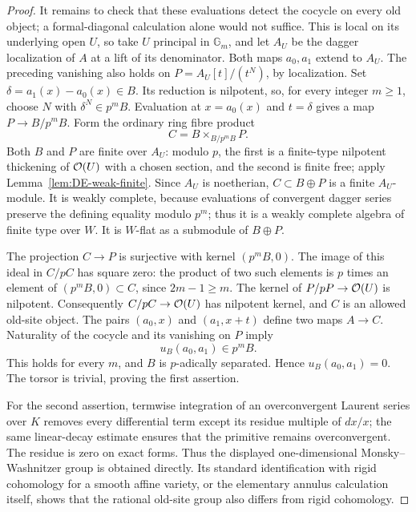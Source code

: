 \begin{proof}
It remains to check that these evaluations detect the cocycle on every old object; a formal-diagonal calculation alone would not suffice.  This is local on its underlying open $U$, so take $U$ principal in $\mathbb G_m$, and let $A_U$ be the dagger localization of $A$ at a lift of its denominator.  Both maps $a_0,a_1$ extend to $A_U$.  The preceding vanishing also holds on
$P=A_U[t]/(t^N)$, by localization.  Set $\delta=a_1(x)-a_0(x)\in B$.  Its reduction is nilpotent, so, for every integer $m\geq1$, choose $N$ with $\delta^N\in p^mB$.  Evaluation at $x=a_0(x)$ and $t=\delta$ gives a map $P\to B/p^mB$.  Form the ordinary ring fibre product
\[
                         C=B\times_{B/p^mB}P.
\]
Both $B$ and $P$ are finite over $A_U$: modulo $p$, the first is a finite-type nilpotent thickening of $\mathcal O(U)$ with a chosen section, and the second is finite free; apply Lemma~\ref{lem:DE-weak-finite}.  Since $A_U$ is noetherian, $C\subset B\oplus P$ is a finite $A_U$-module.  It is weakly complete, because evaluations of convergent dagger series preserve the defining equality modulo $p^m$; thus it is a weakly complete algebra of finite type over $W$.  It is $W$-flat as a submodule of $B\oplus P$.

The projection $C\to P$ is surjective with kernel $(p^mB,0)$.  The image of this ideal in $C/pC$ has square zero: the product of two such elements is $p$ times an element of $(p^mB,0)\subset C$, since $2m-1\geq m$.  The kernel of $P/pP\to\mathcal O(U)$ is nilpotent.  Consequently $C/pC\to\mathcal O(U)$ has nilpotent kernel, and $C$ is an allowed old-site object.  The pairs $(a_0,x)$ and $(a_1,x+t)$ define two maps $A\to C$.  Naturality of the cocycle and its vanishing on $P$ imply
\[
                         u_B(a_0,a_1)\in p^mB.
\]
This holds for every $m$, and $B$ is $p$-adically separated.  Hence $u_B(a_0,a_1)=0$.  The torsor is trivial, proving the first assertion.

For the second assertion, termwise integration of an overconvergent Laurent series over $K$ removes every differential term except its residue multiple of $dx/x$; the same linear-decay estimate ensures that the primitive remains overconvergent.  The residue is zero on exact forms.  Thus the displayed one-dimensional Monsky--Washnitzer group is obtained directly.  Its standard identification with rigid cohomology for a smooth affine variety, or the elementary annulus calculation itself, shows that the rational old-site group also differs from rigid cohomology.
\end{proof}

